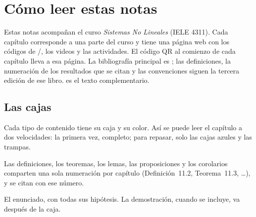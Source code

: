 \chapter*{Cómo leer estas notas}


Estas notas acompañan el curso \emph{Sistemas No Lineales} (IELE 4311). Cada capítulo corresponde a una parte del curso y tiene una página web con los códigos de \matlab/\simulink, los videos y las actividades. El código QR al comienzo de cada capítulo lleva a esa página. La bibliografía principal es \citet{Kha02}; las definiciones, la numeración de los resultados que se citan y las convenciones siguen la tercera edición de ese libro. \citet{KeBr23} es el texto complementario.

\section*{Las cajas}

Cada tipo de contenido tiene su caja y su color. Así se puede leer el capítulo a dos velocidades: la primera vez, completo; para repasar, solo las cajas azules y las trampas.

\begin{definicion}[title={\textcolor{snlazul}{\faBookOpen}\hspace{0.45em}Definición 11.2: así se ve una definición}]{}
Las definiciones, los teoremas, los lemas, las proposiciones y los corolarios comparten una sola numeración por capítulo (Definición~11.2, Teorema~11.3, \dots), y se citan con ese número.
\end{definicion}

\begin{teorema}[title={\textcolor{snlazul}{\faCheckCircle}\hspace{0.45em}Teorema 11.3: así se ve un resultado}]{}
El enunciado, con todas sus hipótesis. La demostración, cuando se incluye, va después de la caja.
\end{teorema}

